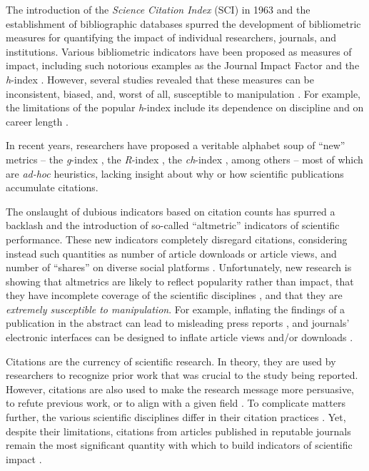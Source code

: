 The introduction of the \textit{Science Citation Index} (SCI) in 1963 \cite{Garfield1963} and the establishment of bibliographic databases spurred the development of bibliometric measures for quantifying the impact of individual researchers, journals, and institutions. Various bibliometric indicators have been proposed as measures of impact, including such notorious examples as the Journal Impact Factor and the \emph{h}-index \cite{Garfield2006, Hirsch2005}. However, several studies revealed that these measures can be inconsistent, biased, and, worst of all, susceptible to manipulation \cite{MacRoberts1989, Narin1996, Cole2000, Glanzel2002, Borgman2002, Vinkler2004, Bornmann2007, Bornmann2008, Alonso2009, Castellano2009, Wilhite2012}. For example, the limitations of the popular \emph{h}-index include its dependence on discipline and on career length \cite{Egghe2007}.

In recent years, researchers have proposed a veritable alphabet soup of ``new'' metrics -- the \emph{g}-index \cite{Egghe2006a}, the \emph{R}-index \cite{Jin2007a}, the \emph{ch}-index \cite{Franceschini2010}, among others -- most of which are \textit{ad-hoc} heuristics, lacking insight about why or how scientific publications accumulate citations.

The onslaught of dubious indicators based on citation counts has spurred a backlash and the introduction of so-called ``altmetric'' indicators of scientific performance. These new indicators completely disregard citations, considering instead such quantities as number of article downloads or article views, and number of ``shares'' on diverse social platforms \cite{Bonetta2009, Fausto2012, Kwok2013}. Unfortunately, new research is showing that altmetrics are likely to reflect popularity rather than impact, that they have incomplete coverage of the scientific disciplines \cite{Haustein2011, Priem2012}, and that they are \textit{extremely susceptible to manipulation}. For example, inflating the findings of a publication in the abstract can lead to misleading press reports \cite{Yavchitz2012}, and journals' electronic interfaces can be designed to inflate article views and/or downloads \cite{Davis2006}.

Citations are the currency of scientific research. In theory, they are used by researchers to recognize prior work that was crucial to the study being reported. However, citations are also used to make the research message more persuasive, to refute previous work, or to align with a given field \cite{Brooks1986}. To complicate matters further, the various scientific disciplines differ in their citation practices \cite{Rosvall2008}. Yet, despite their limitations, citations from articles published in reputable journals remain the most significant quantity with which to build indicators of scientific impact \cite{Bornmann2008}.

